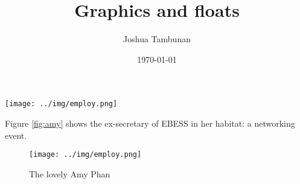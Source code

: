 \documentclass[]{article}
\title{Graphics and floats}
\author{Joshua Tambunan}
\date{\today}
\begin{document}
\maketitle

\texttt{[image: ../img/employ.png]}
    
Figure \ref{fig:amy} shows the ex-secretary of EBESS in her habitat: a networking event.
\begin{figure}
    \centering
    \texttt{[image: ../img/employ.png]}
    \caption{\label{fig:amy}The lovely Amy Phan}
    \label{fig:my_label}
\end{figure}

\end{document}
